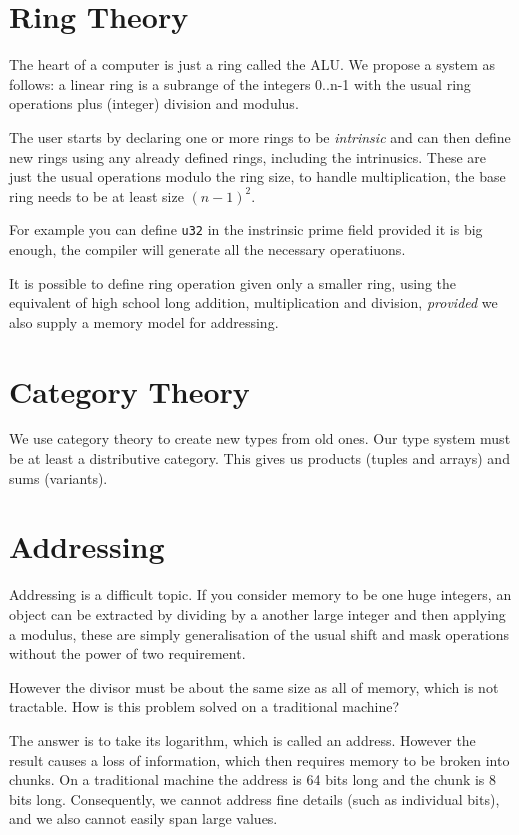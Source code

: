 \documentclass[oneside]{book}
\theoremstyle{plain}
\theoremstyle{definition}
\theoremstyle{plain}
\begin{document}
\section{Ring Theory}
The heart of a computer is just a ring called the ALU. We propose
a system as follows: a linear ring is a subrange of the integers
0..n-1 with the usual ring operations plus (integer) division and
modulus.

The user starts by declaring one or more rings to be {\em intrinsic}
and can then define new rings using any already defined rings, including
the intrinusics. These are just the usual operations modulo the ring size,
to handle multiplication, the base ring needs to be at least size $(n-1)^2$.

For example you can define \verb$u32$ in the instrinsic prime field
provided it is big enough, the compiler will generate all the necessary
operatiuons.

It is possible to define ring operation given only a smaller ring,
using the equivalent of high school long addition, multiplication
and division, {\em provided} we also supply a memory model for
addressing.

\section{Category Theory}
We use category theory to create new types from old ones.
Our type system must be at least a distributive category.
This gives us products (tuples and arrays) and sums (variants).

\section{Addressing}
Addressing is a difficult topic. If you consider memory to be one
huge integers, an object can be extracted by dividing by a
another large integer and then applying a modulus, these are
simply generalisation of the usual shift and mask operations without
the power of two requirement.

However the divisor must be about the same size as all of memory,
which is not tractable. How is this problem solved on a traditional
machine?

The answer is to take its logarithm, which is called an address.
However the result causes a loss of information, which then requires
memory to be broken into chunks. On a traditional machine the address
is 64 bits long and the chunk is 8 bits long. Consequently, we cannot
address fine details (such as individual bits), and we also cannot
easily span large values.
\end{document}
